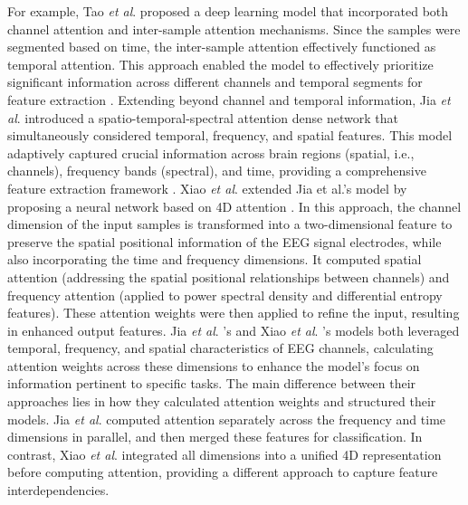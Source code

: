 \documentclass[preprint,12pt]{elsarticle}
\newcommand{\etal}{\textit{et al}. }
\begin{document}
For example, Tao \etal proposed a deep learning model that incorporated both channel attention and inter-sample attention mechanisms. Since the samples were segmented based on time, the inter-sample attention effectively functioned as temporal attention. This approach enabled the model to effectively prioritize significant information across different channels and temporal segments for feature extraction \cite{tao2020eeg}. Extending beyond channel and temporal information, Jia \etal introduced a spatio-temporal-spectral attention dense network that simultaneously considered temporal, frequency, and spatial features. This model adaptively captured crucial information across brain regions (spatial, i.e., channels), frequency bands (spectral), and time, providing a comprehensive feature extraction framework \cite{jia2020sst}. Xiao \etal extended Jia et al.'s model by proposing a neural network based on 4D attention \cite{xiao20224d}. In this approach, the channel dimension of the input samples is transformed into a two-dimensional feature to preserve the spatial positional information of the EEG signal electrodes, while also incorporating the time and frequency dimensions. It computed spatial attention (addressing the spatial positional relationships between channels) and frequency attention (applied to power spectral density and differential entropy features). These attention weights were then applied to refine the input, resulting in enhanced output features. Jia \etal's and Xiao \etal's models both leveraged temporal, frequency, and spatial characteristics of EEG channels, calculating attention weights across these dimensions to enhance the model’s focus on information pertinent to specific tasks. The main difference between their approaches lies in how they calculated attention weights and structured their models. Jia \etal computed attention separately across the frequency and time dimensions in parallel, and then merged these features for classification. In contrast, Xiao \etal integrated all dimensions into a unified 4D representation before computing attention, providing a different approach to capture feature interdependencies.
\end{document}
